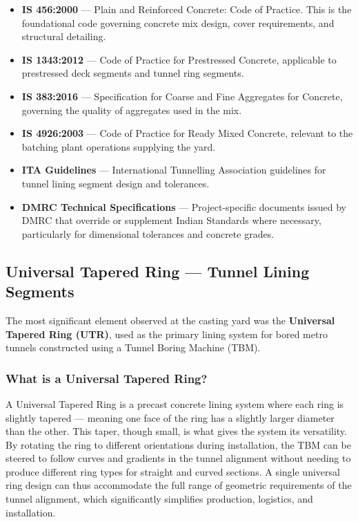 \begin{itemize}
    \item \textbf{IS 456:2000} --- Plain and Reinforced Concrete: Code of Practice. This is the foundational code governing concrete mix design, cover requirements, and structural detailing.
    \item \textbf{IS 1343:2012} --- Code of Practice for Prestressed Concrete, applicable to prestressed deck segments and tunnel ring segments.
    \item \textbf{IS 383:2016} --- Specification for Coarse and Fine Aggregates for Concrete, governing the quality of aggregates used in the mix.
    \item \textbf{IS 4926:2003} --- Code of Practice for Ready Mixed Concrete, relevant to the batching plant operations supplying the yard.
    \item \textbf{ITA Guidelines} --- International Tunnelling Association guidelines for tunnel lining segment design and tolerances.
    \item \textbf{DMRC Technical Specifications} --- Project-specific documents issued by DMRC that override or supplement Indian Standards where necessary, particularly for dimensional tolerances and concrete grades.
\end{itemize}

\subsection{Universal Tapered Ring --- Tunnel Lining Segments}
\par\noindent
The most significant element observed at the casting yard was the \textbf{Universal Tapered Ring (UTR)}, used as the primary lining system for bored metro tunnels constructed using a Tunnel Boring Machine (TBM).

\subsubsection{What is a Universal Tapered Ring?}
\par\noindent
A Universal Tapered Ring is a precast concrete lining system where each ring is slightly tapered --- meaning one face of the ring has a slightly larger diameter than the other. This taper, though small, is what gives the system its versatility. By rotating the ring to different orientations during installation, the TBM can be steered to follow curves and gradients in the tunnel alignment without needing to produce different ring types for straight and curved sections. A single universal ring design can thus accommodate the full range of geometric requirements of the tunnel alignment, which significantly simplifies production, logistics, and installation.

